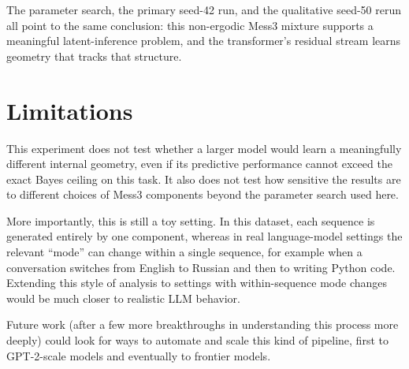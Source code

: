 \documentclass[11pt]{article}
\begin{document}
The parameter search, the primary seed-42 run, and the qualitative seed-50 rerun all point to the same conclusion: this non-ergodic Mess3 mixture supports a meaningful latent-inference problem, and the transformer's residual stream learns geometry that tracks that structure.

\section{Limitations}

This experiment does not test whether a larger model would learn a meaningfully different internal geometry, even if its predictive performance cannot exceed the exact Bayes ceiling on this task. It also does not test how sensitive the results are to different choices of Mess3 components beyond the parameter search used here.

More importantly, this is still a toy setting. In this dataset, each sequence is generated entirely by one component, whereas in real language-model settings the relevant ``mode'' can change within a single sequence, for example when a conversation switches from English to Russian and then to writing Python code. Extending this style of analysis to settings with within-sequence mode changes would be much closer to realistic LLM behavior.

Future work (after a few more breakthroughs in understanding this process more deeply) could look for ways to automate and scale this kind of pipeline, first to GPT-2-scale models and eventually to frontier models.
\end{document}
